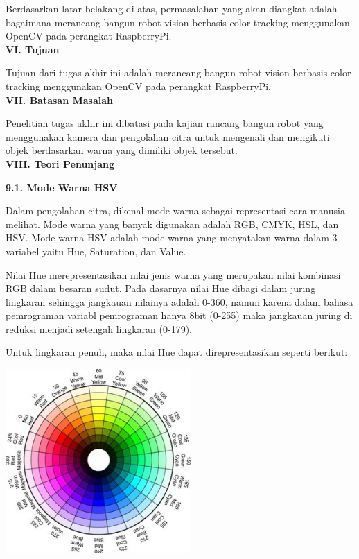 \documentclass[a4paper,12pt]{article}
\begin{document}
Berdasarkan latar belakang di atas, permasalahan yang akan diangkat adalah bagaimana merancang bangun robot vision berbasis color tracking menggunakan OpenCV pada perangkat RaspberryPi.
\\[10pt]
\noindent \textbf{VI. \hspace{9pt} Tujuan}

Tujuan dari tugas akhir ini adalah merancang bangun robot vision berbasis color tracking menggunakan OpenCV pada perangkat RaspberryPi.
\\[10pt]
\noindent \textbf{VII. \hspace{8pt} Batasan Masalah}

Penelitian tugas akhir ini dibatasi pada kajian rancang bangun robot yang menggunakan kamera dan pengolahan citra untuk mengenali dan mengikuti objek berdasarkan warna yang dimiliki objek tersebut.
\\[10pt]
\noindent \textbf{VIII. \hspace{7pt} Teori Penunjang}

\indent \textbf{9.1. \hspace{8pt} Mode Warna HSV}

Dalam pengolahan citra, dikenal mode warna sebagai representasi cara manusia melihat. 
Mode warna yang banyak digunakan adalah RGB, CMYK, HSL, dan HSV. 
Mode warna HSV adalah mode warna yang menyatakan warna dalam 3 variabel yaitu Hue, Saturation, dan Value.

Nilai Hue merepresentasikan nilai jenis warna yang merupakan nilai kombinasi RGB dalam besaran sudut. 
Pada dasarnya nilai Hue dibagi dalam juring lingkaran sehingga jangkauan nilainya adalah 0-360, namun karena dalam bahasa pemrograman variabl pemrograman hanya 8bit (0-255) maka jangkauan juring di reduksi menjadi setengah lingkaran (0-179).

Untuk lingkaran penuh, maka nilai Hue dapat direpresentasikan seperti berikut:
\begin{center}
 \includegraphics[width=200pt]{HSV}
\end{center}
\end{document}
